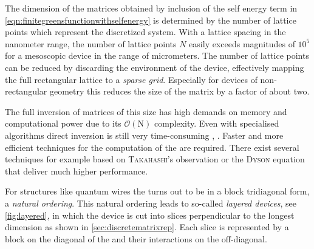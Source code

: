 The dimension of the matrices obtained by inclusion of the self energy term in \cref{eqn:finitegreensfunctionwithselfenergy} is determined by the number of lattice points which represent the discretized system.
With a lattice spacing in the nanometer range, the number of lattice points $N$ easily exceeds magnitudes of $10^5$ for a mesoscopic device in the range of micrometers. 
The number of lattice points can be reduced by discarding the environment of the device, effectively mapping the full rectangular lattice to a \emph{sparse grid}. Especially for devices of non-rectangular geometry this reduces the size of the matrix by a factor of about two.\par
The full inversion of matrices of this size has high demands on memory and computational power due to its $\mathcal{O}(\text{N})$ complexity. Even with specialised algorithms direct inversion is still very time-consuming \cite{Datta2000.2.53}, \cite{Li2009Thesis}. Faster and more efficient techniques for the computation of the \gfnc{} are required. There exist several techniques for example based on \textsc{Takahashi}'s observation \cite{Takahashi1973} or the \textsc{Dyson} equation that deliver much higher performance.\par
For structures like quantum wires the \hamil{} turns out to be in a block tridiagonal form, a \emph{natural ordering}. This natural ordering leads to so-called \emph{layered devices}, see \cref{fig:layered}, in which the device is cut into slices perpendicular to the longest dimension as shown in \cref{sec:discretematrixrep}. Each slice is represented by a block on the diagonal of the \hamil{} and their interactions on the off-diagonal.
